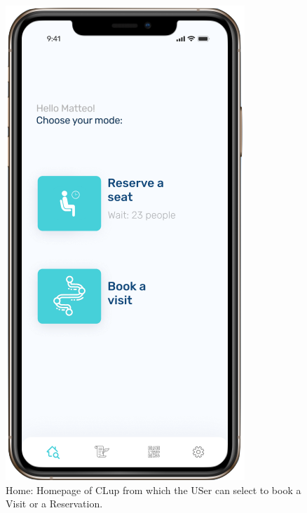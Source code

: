 \begin{figure}[H]
  \caption{Home: Homepage of CLup from which the USer can select to book a Visit or a Reservation.}
  \label{fig:Home}
  \centering
  \includegraphics[scale=0.30]{images/mockup/home1.png}

\end{figure}





